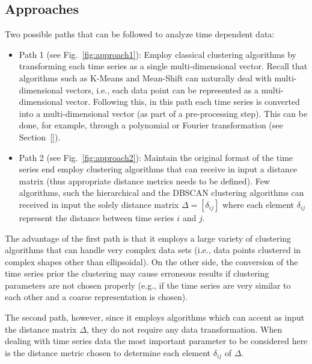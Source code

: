 \subsection{Approaches}
\label{sec:timeDepDataMiningApproaches} 
Two possible paths  that can be followed to analyze time dependent data:
\begin{itemize}
  \item Path 1 (see Fig.~\ref{fig:approach1}): Employ classical clustering algorithms by transforming each time series as 
                                  a single multi-dimensional vector. Recall that algorithms such as K-Means 
                                  and Mean-Shift can naturally deal with multi-dimensional vectors, i.e., each data 
                                  point can be represented as a multi-dimensional vector. Following this, in this path
                                  each time series is converted into a multi-dimensional vector (as part of a 
                                  pre-processing step). This can be done, for example, through a polynomial or Fourier 
                                  transformation (see Section~\ref{}).
  \item Path 2 (see Fig.~\ref{fig:approach2}): Maintain the original format of the time series end employ clustering algorithms that 
                                  can receive in input a distance matrix (thus appropriate distance metrics needs to be 
                                  defined). Few algorithms, such the hierarchical and the DBSCAN clustering
                                  algorithms can received in input the solely distance matrix $\Delta=[\delta_{ij}]$ where each 
                                  element $\delta_{ij}$ represent the distance between time series $i$ and $j$.
\end{itemize}

The advantage of the first path is that it employs a large variety of clustering algorithms that can handle very complex 
data sets (i.e., data points clustered in complex shapes other than ellipsoidal). On the other side, the 
conversion of the time series prior the clustering may cause erroneous results if clustering
parameters are not chosen properly (e.g., if the time series are very similar to each other and a coarse 
representation is chosen).

The second path, however, since it employs algorithms which can accent as input the distance matrix $\Delta$, they do not 
require any data transformation. When dealing with time series data the most important parameter to be considered 
here is the distance metric chosen to determine each element $\delta_{ij}$ of $\Delta$.

